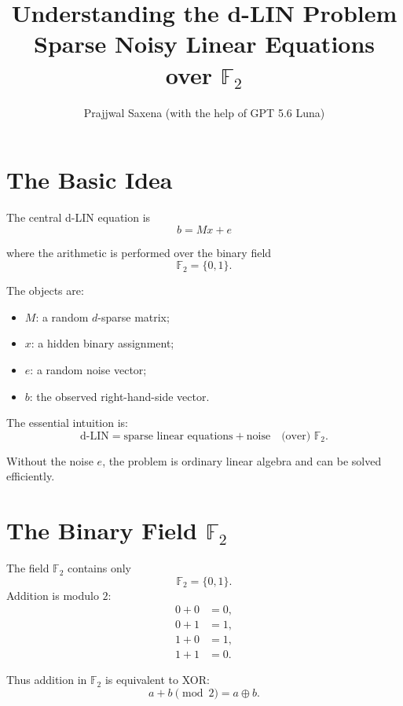 \documentclass[11pt,a4paper]{article}
\title{\textbf{Understanding the d-LIN Problem}\\
\large Sparse Noisy Linear Equations over $\mathbb{F}_2$}
\author{Prajjwal Saxena (with the help of GPT 5.6 Luna)}
\date{}
\newcommand{\F}{\mathbb{F}}
\begin{document}
\maketitle



\tableofcontents
\newpage

\section{The Basic Idea}

The central d-LIN equation is\begin{equation}
    \boxed{b = Mx + e}
    \label{eq:main}
\end{equation}

where the arithmetic is performed over the binary field \[
    \F_2 = \{0,1\}.
\]

The objects are:
\begin{itemize}
    \item $M$: a random $d$-sparse matrix;
    \item $x$: a hidden binary assignment;
    \item $e$: a random noise vector;
    \item $b$: the observed right-hand-side vector.
\end{itemize}

The essential intuition is:
\textbf{\[
\text{d-LIN} =
\text{sparse linear equations}
+
\text{noise}
\quad\text{(over) }\F_2.
\]}

Without the noise $e$, the problem is ordinary linear algebra and can
be solved efficiently. 


\section{The Binary Field \texorpdfstring{$\F_2$}{F2}}
The field $\F_2$ contains only
\[
    \F_2 = \{0,1\}.
\]
Addition is modulo $2$:\begin{align}
0+0 &= 0,\\
0+1 &= 1,\\
1+0 &= 1,\\
1+1 &= 0.
\end{align}

Thus addition in $\F_2$ is equivalent to XOR: \begin{equation}
    a+b \pmod 2 = a\oplus b.
\end{equation}
\end{document}
